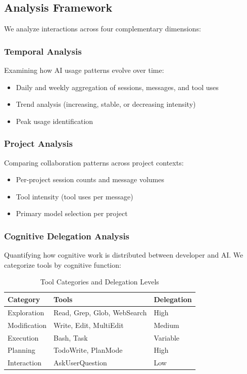\subsection{Analysis Framework}

We analyze interactions across four complementary dimensions:

\subsubsection{Temporal Analysis}

Examining how AI usage patterns evolve over time:
\begin{itemize}
    \item Daily and weekly aggregation of sessions, messages, and tool uses
    \item Trend analysis (increasing, stable, or decreasing intensity)
    \item Peak usage identification
\end{itemize}

\subsubsection{Project Analysis}

Comparing collaboration patterns across project contexts:
\begin{itemize}
    \item Per-project session counts and message volumes
    \item Tool intensity (tool uses per message)
    \item Primary model selection per project
\end{itemize}

\subsubsection{Cognitive Delegation Analysis}

Quantifying how cognitive work is distributed between developer and AI. We categorize tools by cognitive function:

\begin{table}[h]
\caption{Tool Categories and Delegation Levels}
\label{tab:tools}
\begin{tabular}{lll}
\toprule
\textbf{Category} & \textbf{Tools} & \textbf{Delegation} \\
\midrule
Exploration & Read, Grep, Glob, WebSearch & High \\
Modification & Write, Edit, MultiEdit & Medium \\
Execution & Bash, Task & Variable \\
Planning & TodoWrite, PlanMode & High \\
Interaction & AskUserQuestion & Low \\
\bottomrule
\end{tabular}
\end{table}

